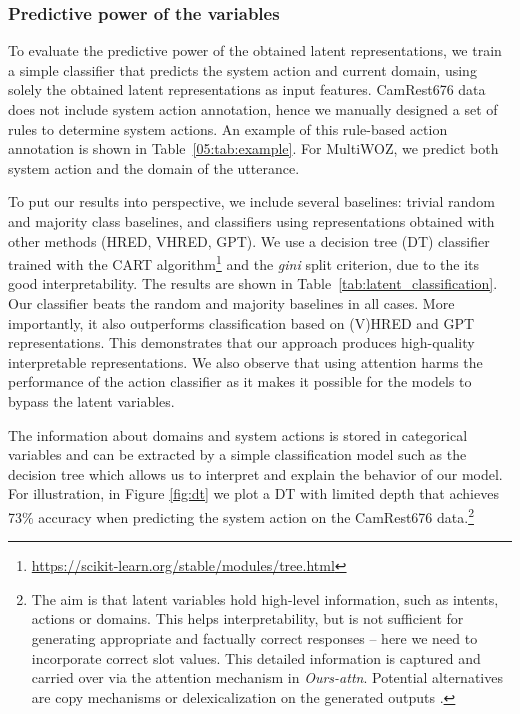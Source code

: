 \subsubsection{Predictive power of the variables}
\label{sec:pred_latents}
To evaluate the predictive power of the obtained latent representations, we train a simple classifier that predicts the system action and current domain, using solely the obtained latent representations as input features.
CamRest676 data does not include system action annotation, hence we manually designed a set of rules to determine system actions.
An example of this rule-based action annotation is shown in Table~\ref{05:tab:example}.
For MultiWOZ, we predict both system action and the domain of the utterance.

To put our results into perspective, we include several baselines: trivial random and majority class baselines, and classifiers using representations obtained with other methods (HRED, VHRED, GPT).
We use a decision tree (DT) classifier trained with the CART algorithm\footnote{\url{https://scikit-learn.org/stable/modules/tree.html}} and the \emph{gini} split criterion, due to the its good interpretability.
The results are shown in Table~\ref{tab:latent_classification}.
Our classifier beats the random and majority baselines in all cases.
More importantly, it also outperforms classification based on (V)HRED and GPT representations.
This demonstrates that our approach produces high-quality interpretable representations.
We also observe that using attention harms the performance of the action classifier as it makes it possible for the models to bypass the latent variables.

The information about domains and system actions is stored in categorical variables and can be extracted by a simple classification model such as the decision tree which allows us to interpret and explain the behavior of our model.
For illustration, in Figure \ref{fig:dt} we plot a DT with limited depth that achieves 73\% accuracy when predicting the system action on the CamRest676 data.\footnote{The aim is that latent variables hold high-level information, such as intents, actions or domains. This helps interpretability, but is not sufficient for generating appropriate and factually correct responses -- here we need to incorporate correct slot values. This detailed information is captured and carried over via the attention mechanism in \emph{Ours-attn}. Potential alternatives are copy mechanisms \cite{lei2018} or delexicalization on the generated outputs \cite{henderson_robust_2014,peng2021soloist}.}

